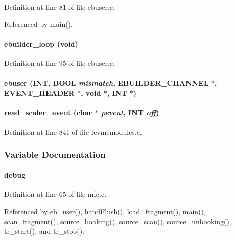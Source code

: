 Definition at line 81 of file ebuser.c.

Referenced by main().
\paragraph[{ebuilder\_\-loop}]{ ebuilder\_\-loop (void)}\hfill\label{ebuser_8c_a6d3cd4998154578032791c44c641fde0}


Definition at line 95 of file ebuser.c.
\paragraph[{ebuser}]{ ebuser ({\bf INT}, \/  {\bf BOOL} {\em mismatch}, \/  EBUILDER\_\-CHANNEL $\ast$, \/  {\bf EVENT\_\-HEADER} $\ast$, \/  void $\ast$, \/  {\bf INT} $\ast$)}\hfill\label{ebuser_8c_a4ceddba3cdef617fb3491c07372aa69c}
\paragraph[{read\_\-scaler\_\-event}]{ read\_\-scaler\_\-event (char $\ast$ {\em pevent}, \/  {\bf INT} {\em off})}\hfill\label{ebuser_8c_af3ad062393c1437922bae26841d8927c}


Definition at line 841 of file fevmemodules.c.

\subsubsection{Variable Documentation}
\paragraph[{debug}]{ {\bf debug}}\hfill\label{ebuser_8c_a81f0a890e023743f1b88d0cb7d4f74db}


Definition at line 65 of file mfe.c.

Referenced by eb\_\-user(), handFlush(), load\_\-fragment(), main(), scan\_\-fragment(), source\_\-booking(), source\_\-scan(), source\_\-unbooking(), tr\_\-start(), and tr\_\-stop().
